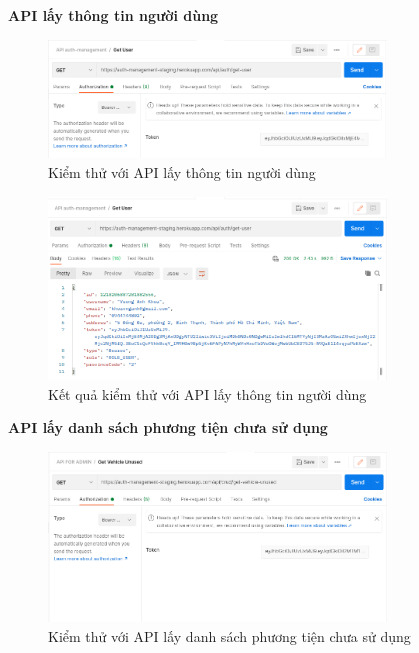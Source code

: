 		\newpage
		
		\textbf{API lấy thông tin người dùng}
		
		\begin{figure}[!ht]
			\includegraphics[width=0.8\textwidth]{Images/testing/API-get-user.png}
			\centering
			\linebreak
			\caption{Kiểm thử với API lấy thông tin người dùng}
		\end{figure}
		
		\begin{figure}[!ht]
			\includegraphics[width=0.8\textwidth]{Images/testing/API-get-user-result.png}
			\centering
			\linebreak
			\caption{Kết quả kiểm thử với API lấy thông tin người dùng}
		\end{figure}
		
		\newpage
		
		\textbf{API lấy danh sách phương tiện chưa sử dụng}
		
		\begin{figure}[!ht]
			\includegraphics[width=0.8\textwidth]{Images/testing/API-get-vehicle-unused.png}
			\centering
			\linebreak
			\caption{Kiểm thử với API lấy danh sách phương tiện chưa sử dụng}
		\end{figure}
		
